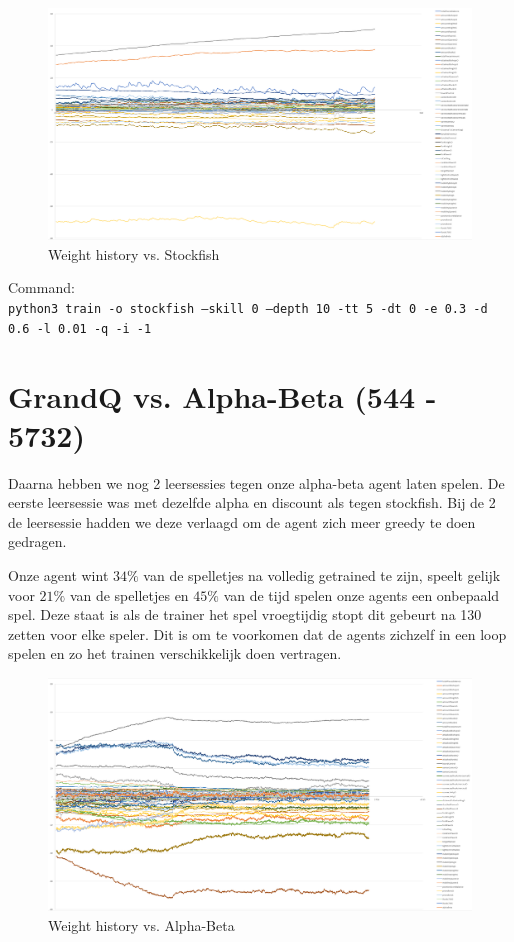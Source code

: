 \documentclass[a4paper,openany]{uantwerpenassignment}
\newcommand{\codeword}[1]{
    \colorbox{code}{\texttt{\textcolor{codetext}{#1}}}
}
\begin{document}
\begin{figure}[h]
    \centering
    \includegraphics[width=\textwidth]{images/stockfish.png}
    \caption{Weight history vs. Stockfish}
    \label{fig:stockfish}
\end {figure}

Command:\\
\codeword{python3 train -o stockfish --skill 0 --depth 10 -tt 5 -dt 0 -e 0.3 -d 0.6 -l 0.01 -q -i -1}
\pagebreak

\section{GrandQ vs. Alpha-Beta (544 - 5732)}

Daarna hebben we nog 2 leersessies tegen onze alpha-beta agent laten spelen. De eerste leersessie was met dezelfde alpha en discount als tegen stockfish. Bij de 2 de leersessie hadden we deze verlaagd om de agent zich meer greedy te doen gedragen.

Onze agent wint $34\%$ van de spelletjes na volledig getrained te zijn, speelt gelijk voor $21\%$ van de spelletjes en $45\%$ van de tijd spelen onze agents een onbepaald spel. Deze staat is als de trainer het spel vroegtijdig stopt dit gebeurt na 130 zetten voor elke speler. Dit is om te voorkomen dat de agents zichzelf in een loop spelen en zo het trainen verschikkelijk doen vertragen.

\begin{figure}[h]
    \centering
    \includegraphics[width=\textwidth]{images/ab.png}
    \caption{Weight history vs. Alpha-Beta}
    \label{fig:ab}
\end {figure}
\end{document}
